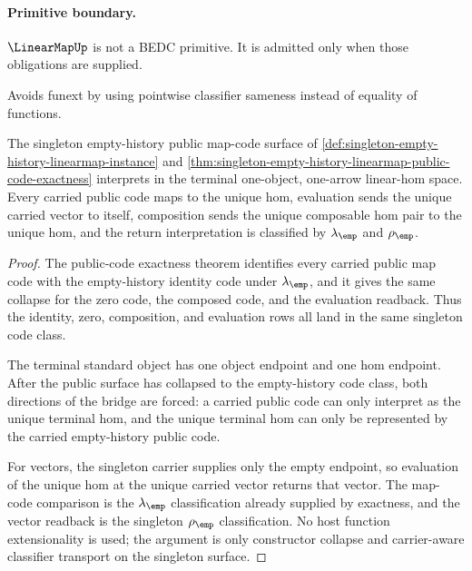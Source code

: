 \paragraph{Primitive boundary.}
\(\LinearMapUp\) is not a BEDC primitive. It is admitted only when those obligations are supplied.

\begin{remark}
\label{rem:linearmap-zero-axiom-note}
Avoids funext by using pointwise classifier sameness instead of equality of functions.
\end{remark}

\begin{theorem}
\label{thm:linearmap-terminal-standard-bridge}
The singleton empty-history public map-code surface of
\autoref{def:singleton-empty-history-linearmap-instance} and
\autoref{thm:singleton-empty-history-linearmap-public-code-exactness}
interprets in the terminal one-object, one-arrow linear-hom space. Every
carried public code maps to the unique hom, evaluation sends the unique
carried vector to itself, composition sends the unique composable hom pair to
the unique hom, and the return interpretation is classified by
$\lambda_{\emp}$ and $\rho_{\emp}$.
\end{theorem}
\begin{proof}
The public-code exactness theorem identifies every carried public map code
with the empty-history identity code under $\lambda_{\emp}$, and it gives the
same collapse for the zero code, the composed code, and the evaluation
readback. Thus the identity, zero, composition, and evaluation rows all land in
the same singleton code class.

The terminal standard object has one object endpoint and one hom endpoint.
After the public surface has collapsed to the empty-history code class, both
directions of the bridge are forced: a carried public code can only interpret
as the unique terminal hom, and the unique terminal hom can only be represented
by the carried empty-history public code.

For vectors, the singleton carrier supplies only the empty endpoint, so
evaluation of the unique hom at the unique carried vector returns that vector.
The map-code comparison is the $\lambda_{\emp}$ classification already supplied
by exactness, and the vector readback is the singleton $\rho_{\emp}$
classification. No host function extensionality is used; the argument is only
constructor collapse and carrier-aware classifier transport on the singleton
surface.
\end{proof}

